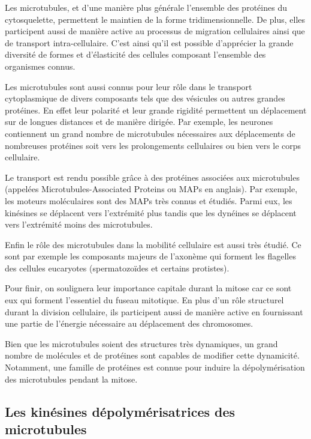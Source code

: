 \documentclass[12pt,a4paper,twoside,openright]{book}
\begin{document}
Les microtubules, et d'une manière plus générale l'ensemble des
protéines du cytosquelette, permettent le maintien de la forme
tridimensionnelle. De plus, elles participent aussi de manière active au
processus de migration cellulaires ainsi que de transport
intra-cellulaire. C'est ainsi qu'il est possible d'apprécier la grande
diversité de formes et d'élasticité des cellules composant l'ensemble
des organismes connus.

Les microtubules sont aussi connus pour leur rôle dans le transport
cytoplasmique de divers composants tels que des vésicules ou autres
grandes protéines. En effet leur polarité et leur grande rigidité
permettent un déplacement sur de longues distances et de manière
dirigée. Par exemple, les neurones contiennent un grand nombre de
microtubules nécessaires aux déplacements de nombreuses protéines soit
vers les prolongements cellulaires ou bien vers le corps cellulaire.

Le transport est rendu possible grâce à des protéines associées aux
microtubules (appelées Microtubules-Associated Proteins ou MAPs en
anglais). Par exemple, les moteurs moléculaires sont des MAPs très
connus et étudiés. Parmi eux, les kinésines se déplacent vers
l'extrémité plus tandis que les dynéines se déplacent vers l'extrémité
moins des microtubules.

Enfin le rôle des microtubules dans la mobilité cellulaire est aussi
très étudié. Ce sont par exemple les composants majeurs de l'axonème qui
forment les flagelles des cellules eucaryotes (spermatozoïdes et
certains protistes).

Pour finir, on soulignera leur importance capitale durant la mitose car
ce sont eux qui forment l'essentiel du fuseau mitotique. En plus d'un
rôle structurel durant la division cellulaire, ils participent aussi de
manière active en fournissant une partie de l'énergie nécessaire au
déplacement des chromosomes.

Bien que les microtubules soient des structures très dynamiques, un
grand nombre de molécules et de protéines sont capables de modifier
cette dynamicité. Notamment, une famille de protéines est connue pour
induire la dépolymérisation des microtubules pendant la mitose.

\subsection{Les kinésines dépolymérisatrices des
microtubules}\label{les-kinuxe9sines-duxe9polymuxe9risatrices-des-microtubules}
\end{document}
